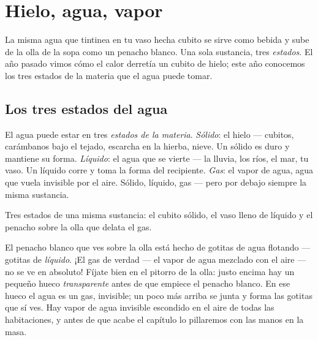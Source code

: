 \chapter{Hielo, agua, vapor}\label{ch:g2:ice-water-steam}

La misma agua que tintinea en tu vaso hecha cubito se sirve como
bebida y sube de la olla de la sopa como un penacho blanco. Una sola
sustancia, tres \emph{estados}. El año pasado vimos cómo el calor
derretía un cubito de hielo; este año conocemos los tres estados
de la materia que el agua puede tomar.

\section{Los tres estados del agua}

\begin{example}\label{ex:g2:ice-water-steam:where}
El agua puede estar en tres \emph{estados de la materia}.
\emph{Sólido}: el hielo --- cubitos, carámbanos bajo el tejado,
escarcha en la hierba, nieve. Un sólido es duro y mantiene su forma.
\emph{Líquido}: el agua que se vierte --- la lluvia, los ríos, el mar,
tu vaso. Un líquido corre y toma la forma del recipiente. \emph{Gas}:
el vapor de agua, agua que vuela invisible por el aire. Sólido,
líquido, gas --- pero por debajo siempre la misma sustancia.
\end{example}

\begin{omfigure}

{\small Tres estados de una misma sustancia: el cubito sólido, el vaso
lleno de líquido y el penacho sobre la olla que delata el gas.}
\end{omfigure}

\begin{remark}\label{rem:g2:ice-water-steam:invisible}
El penacho blanco que ves sobre la olla está hecho de gotitas de agua
flotando --- gotitas de \emph{líquido}. ¡El gas de verdad --- el vapor
de agua mezclado con el aire --- no se ve en absoluto! Fíjate bien en
el pitorro de la olla: justo encima hay un pequeño hueco
\emph{transparente} antes de que empiece el penacho blanco. En ese
hueco el agua es un gas, invisible; un poco más arriba se junta y
forma las gotitas que sí ves. Hay vapor de agua invisible escondido en
el aire de todas las habitaciones, y antes de que acabe el capítulo lo
pillaremos con las manos en la masa.
\end{remark}

